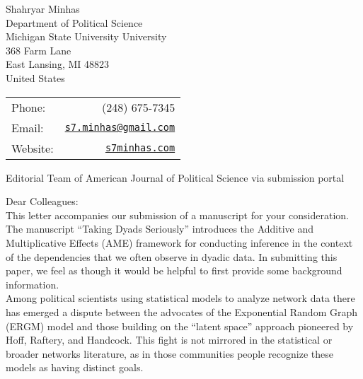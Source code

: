 \documentclass[letterpaper]{article}
\begin{document}
\thispagestyle{empty}

  
  
  \begin{minipage}{0.64\linewidth}
Shahryar Minhas \\
Department of Political Science \\
Michigan State University University \\
368 Farm Lane \\
East Lansing, MI 48823\\
United States
\end{minipage}
\begin{minipage}{0.45\linewidth}
  \begin{tabular}{lr}
    Phone: & (248) 675-7345 \\
    Email: & \href{mailto:s7.minhas@gmail.com}{\tt s7.minhas@gmail.com}  \\
    Website:& \href{http://s7minhas.com/}{\tt s7minhas.com}
  \end{tabular}
\end{minipage}
  
\vspace{.5in}

{Editorial Team of American Journal of Political Science via submission portal}

\vspace{0.25in}

Dear Colleagues:\\[1ex]

This letter accompanies our submission of a manuscript for your consideration. The manuscript ``Taking Dyads Seriously'' introduces the Additive and Multiplicative Effects (AME) framework for conducting inference in the context of the dependencies that we often observe in dyadic data. In submitting this paper, we feel as though it would be helpful to first provide some background information. \\[1ex]

Among political scientists using statistical models to analyze network data there has emerged a dispute between the advocates of the Exponential Random Graph (ERGM) model and those building on the ``latent space'' approach pioneered by Hoff, Raftery, and Handcock. This fight is not mirrored in the statistical or broader networks literature, as in those communities people recognize these models as having distinct goals. \\[1ex]
\end{document}
